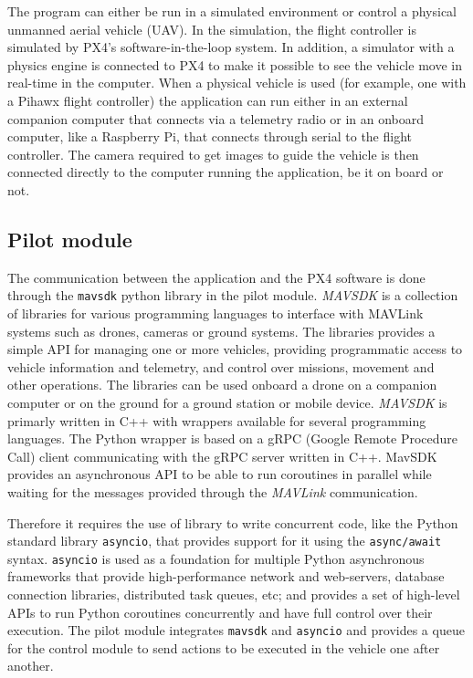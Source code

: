 The program can either be run in a simulated environment or control a physical unmanned aerial vehicle (UAV).
In the simulation, the flight controller is simulated by PX4's software-in-the-loop system. 
In addition, a simulator with a physics engine is connected to PX4 to make it possible to see the vehicle move in real-time in the computer.
When a physical vehicle is used (for example, one with a Pihawx flight controller) the application can run either in an external companion computer that connects via a telemetry radio or in an onboard computer, like a Raspberry Pi, that connects through serial to the flight controller.
The camera required to get images to guide the vehicle is then connected directly to the computer running the application, be it on board or not.

\subsection{Pilot module}

The communication between the application and the PX4 software is done through the \verb|mavsdk| python library in the pilot module.
\emph{MAVSDK} is a collection of libraries for various programming languages to interface with MAVLink systems such as drones, cameras or ground systems.
The libraries provides a simple API for managing one or more vehicles, providing programmatic access to vehicle information and telemetry, and control over missions, movement and other operations.
The libraries can be used onboard a drone on a companion computer or on the ground for a ground station or mobile device.
\emph{MAVSDK} is primarly written in C++ with wrappers available for several programming languages.
The Python wrapper is based on a gRPC (Google Remote Procedure Call) client communicating with the gRPC server written in C++.
MavSDK provides an asynchronous API to be able to run coroutines in parallel while waiting for the messages provided through the \emph{MAVLink} communication.

Therefore it requires the use of library to write concurrent code, like the Python standard library \verb|asyncio|, 
that provides support for it using the \verb|async/await| syntax.
\verb|asyncio| is used as a foundation for multiple Python asynchronous frameworks that provide high-performance network and web-servers, database connection libraries, distributed task queues, etc; 
and provides a set of high-level APIs to run Python coroutines concurrently and have full control over their execution.
The pilot module integrates \verb|mavsdk| and \verb|asyncio| and provides a queue for the control module to send actions to be executed in the vehicle one after another.

